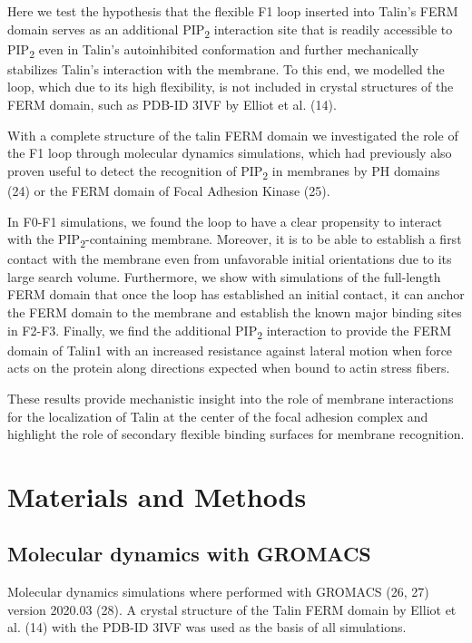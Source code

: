 \documentclass[
  letterpaper,
  DIV=11,
  numbers=noendperiod]{scrartcl}
\begin{document}
Here we test the hypothesis that the flexible F1 loop inserted into
Talin's FERM domain serves as an additional PIP\textsubscript{2}
interaction site that is readily accessible to PIP\textsubscript{2} even
in Talin's autoinhibited conformation and further mechanically
stabilizes Talin's interaction with the membrane. To this end, we
modelled the loop, which due to its high flexibility, is not included in
crystal structures of the FERM domain, such as PDB-ID 3IVF by Elliot et
al. (14).

With a complete structure of the talin FERM domain we investigated the
role of the F1 loop through molecular dynamics simulations, which had
previously also proven useful to detect the recognition of
PIP\textsubscript{2} in membranes by PH domains (24) or the FERM domain
of Focal Adhesion Kinase (25).

In F0-F1 simulations, we found the loop to have a clear propensity to
interact with the PIP\textsubscript{2}-containing membrane. Moreover, it
is to be able to establish a first contact with the membrane even from
unfavorable initial orientations due to its large search volume.
Furthermore, we show with simulations of the full-length FERM domain
that once the loop has established an initial contact, it can anchor the
FERM domain to the membrane and establish the known major binding sites
in F2-F3. Finally, we find the additional PIP\textsubscript{2}
interaction to provide the FERM domain of Talin1 with an increased
resistance against lateral motion when force acts on the protein along
directions expected when bound to actin stress fibers.

These results provide mechanistic insight into the role of membrane
interactions for the localization of Talin at the center of the focal
adhesion complex and highlight the role of secondary flexible binding
surfaces for membrane recognition.

\hypertarget{materials-and-methods}{%
\section{Materials and Methods}\label{materials-and-methods}}

\hypertarget{molecular-dynamics-with-gromacs}{%
\subsection{Molecular dynamics with
GROMACS}\label{molecular-dynamics-with-gromacs}}

Molecular dynamics simulations where performed with GROMACS (26, 27)
version 2020.03 (28). A crystal structure of the Talin FERM domain by
Elliot et al. (14) with the PDB-ID 3IVF was used as the basis of all
simulations.
\end{document}
